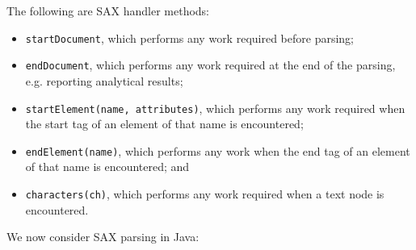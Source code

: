 \documentclass[a4paper, openany]{memoir}
\begin{document}
\noindent The following are SAX handler methods:
\begin{itemize}
    \item \texttt{startDocument}, which performs any work required before parsing;
    \item \texttt{endDocument}, which performs any work required at the end of the parsing, e.g. reporting analytical results;
    \item \texttt{startElement(name, attributes)}, which performs any work required when the start tag of an element of that name is encountered;
    \item \texttt{endElement(name)}, which performs any work when the end tag of an element of that name is encountered; and
    \item \texttt{characters(ch)}, which performs any work required when a text node is encountered.
\end{itemize}
We now consider SAX parsing in Java:
\end{document}

